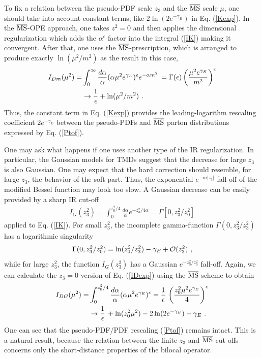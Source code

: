 To fix a  relation between the pseudo-PDF scale $z_3$  and the $\overline{\rm MS}$ scale $\mu$,
one should take into account constant terms, like $2 \ln (2e^{-  \gamma_E })$  in Eq. (\ref{Kexp}).
In the $\overline{\rm MS}$-OPE approach,
  one takes $z^2=0$
and  then  applies
 the dimensional regularization which   adds  the  $\alpha^{\epsilon}$ factor into the integral
(\ref{IK}) making it convergent. After that, one    uses the $\overline{\rm MS}$-prescription,
which is   arranged  to produce  exactly
 $\ln (\mu^2/m^2)$ as the result in this case,
   \begin{align}
  I_{Dm} (\mu^2) =& \int_0^\infty \frac{d\alpha}{\alpha}  (\alpha \mu^2 e^{\gamma_E})^{\epsilon}  e^{-   \alpha m^2} \,
  =\Gamma (\epsilon) \left ( \frac{\mu^2 e^{\gamma_E}}{m^2} \right )^\epsilon \nonumber \\  & \to
  \frac1{\epsilon}   + \ln (\mu^2/m^2)  \  .
  \label{ImM}
     \end{align}
 Thus,  the constant  term in Eq. (\ref{Kexp})
provides the leading-logarithm rescaling coefficient
$2e^{-  \gamma_E}$  between the pseudo-PDFs and $\overline{\rm MS}$ parton distributions
expressed by Eq. (\ref{Ptof}).





One may ask what happens  if one uses another type of    the IR regularization.
In particular,  the  Gaussian models for TMDs suggest that the
decrease for large  $z_3$ is also Gaussian.  One may expect
 that    the hard correction
should resemble,  for  large $z_3$,  the behavior of the soft part.
  Thus,   the exponential $e^{-m|z_3|}$ fall-off of the modified
Bessel function may  look   too slow.
A  Gaussian decrease can  be easily  provided by a sharp IR cut-off
    \begin{align}
  I_G (z_3^2) = \int_0^{z_0^2/4}  \frac{d\alpha}{\alpha}    e^{-z_3^2/4\alpha } = \Gamma [0,z_3^2/z_0^2]
  \label{IDexp}
     \end{align}
applied to  Eq. (\ref{IK}).  For small $z_3^2$,  the incomplete
gamma-function  $ \Gamma (0,z_3^2/z_3^2)$   has a logarithmic singularity
   \begin{align}
  \Gamma (0,z_3^2/z_0^2) =  \ln (z_0^2/z_3^2) -  \gamma_E + {\cal O} (z_3^2)  \  ,
  \label{Dexp0}
     \end{align}
     while for large $z_3^2$, the function  $I_G (z_3^2)$  has  a Gaussian  $e^{-z_3^2/z_0^2}$  fall-off.
Again, we  can  calculate the $z_3=0$ version of
Eq. (\ref{IDexp})  using the $\overline{\rm MS}$-scheme to obtain
  \begin{align}
  I_{DG} (\mu^2) = & \int_0^{z_0^2/4}  \frac{d\alpha}{\alpha}  (\alpha \mu^2  e^{\gamma_E})^{\epsilon}    =
  \frac1{\epsilon} \,  \left (\frac{ z_0^2  \mu^2  e^{\gamma_E}}{4}  \right )^{\epsilon} \nonumber \\  &
  \to  \frac1{\epsilon} \, + \ln (z_0^2 \mu^2    ) -2  \ln ( 2 e^{-\gamma_E}) -  \gamma_E \ .
  \label{IDexp2}
     \end{align}
One can see that the pseudo-PDF/PDF rescaling (\ref{Ptof}) remains intact.
This   is a natural result, because the   relation between the finite-$z_3$
and $\overline{\rm MS}$  cut-offs  concerns only the short-distance  properties
of  the bilocal operator.



